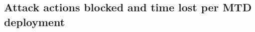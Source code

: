 \documentclass{cshonours}
\begin{document}
%
\subsection{Attack actions blocked and time lost per MTD deployment}
\label{subsec:aio-disruption}
\end{document}
